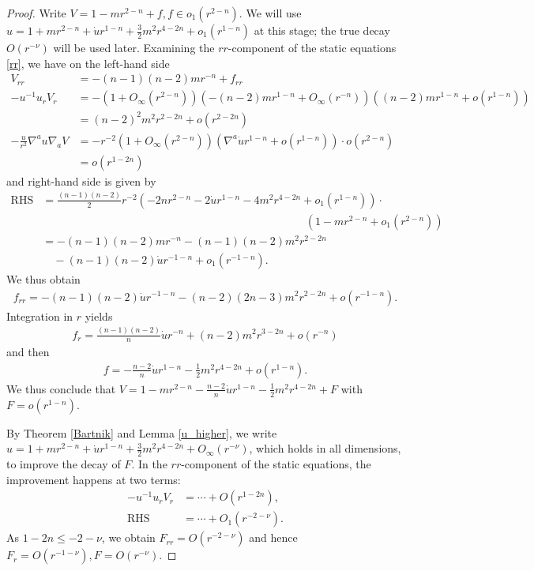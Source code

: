 \documentclass[12pt,twoside]{article}
\theoremstyle{plain}
\theoremstyle{definition}
\theoremstyle{remark}
\newcommand{\na}{\nabla}
\newcommand{\lt}{\left}
\newcommand{\rt}{\right}
\numberwithin{equation}{section}
\begin{document}
\begin{proof}
Write $V = 1 - mr^{2-n} + f, f \in o_1(r^{2-n})$. We will use $u = 1 + mr^{2-n} + \dot u r^{1-n} + \frac{3}{2}m^2 r^{4-2n} + o_1(r^{1-n})$ at this stage; the true decay $O(r^{-\nu})$ will be used later. Examining the $rr$-component of the static equations \eqref{rr}, we have on the left-hand side
\begin{align*}
V_{rr} &= -(n-1)(n-2)m r^{-n} + f_{rr}\\
-u^{-1}u_r V_r &= - (1 + O_\infty(r^{2-n}))(-(n-2)m r^{1-n} + O_\infty(r^{-n}))((n-2)m r^{1-n} + o(r^{1-n})) \\ &= (n-2)^2m^2 r^{2-2n} + o(r^{2-2n})\\
-\frac{u}{r^2}\na^a u \na_a V &= - r^{-2} (1 + O_\infty(r^{2-n})) (\na^a \dot u r^{1-n} + o(r^{1-n})) \cdot o(r^{2-n}) \\ &= o(r^{1-2n})
\end{align*} and right-hand side is given by
\begin{align*}
\mbox{RHS} &= \frac{(n-1)(n-2)}{2} r^{-2} \lt( -2nr^{2-n} - 2\dot u r^{1-n} - 4m^2 r^{4-2n} + o_1(r^{1-n}) \rt) \cdot \\ & \hspace{10cm} (1 - m r^{2-n} + o_1(r^{2-n}) ) \\
&= -(n-1)(n-2)mr^{-n} - (n-1)(n-2)m^2 r^{2-2n} \\
&\quad - (n-1)(n-2)\dot u r^{-1-n} + o_1(r^{-1-n}).
\end{align*}
We thus obtain
\begin{align*}
f_{rr} = - (n-1)(n-2) \dot u r^{-1-n} - (n-2)(2n-3)m^2 r^{2-2n} + o(r^{-1-n}).
\end{align*}
Integration in $r$ yields
\begin{align*}
f_r = \frac{(n-1)(n-2)}{n} \dot u r^{-n} + (n-2) m^2 r^{3-2n} + o(r^{-n})
\end{align*}
and then
\begin{align*}
f = - \frac{n-2}{n}\dot u r^{1-n} - \frac{1}{2}m^2 r^{4-2n} + o(r^{1-n}).
\end{align*}
We thus conclude that $V = 1 - m r^{2-n} - \frac{n-2}{n}\dot u r^{1-n} - \frac{1}{2}m^2 r^{4-2n} + F$ with $F = o(r^{1-n})$.

By Theorem \ref{Bartnik} and Lemma \ref{u_higher}, we write $u = 1 + m r^{2-n} + \dot u r^{1-n} + \frac{3}{2} m^2 r^{4-2n} + O_\infty(r^{-\nu})$, which holds in all dimensions, to improve the decay of $F$. In the $rr$-component of the static equations, the improvement happens at two terms:
\begin{align*}
-u^{-1}u_r V_r &= \cdots + O(r^{1-2n}),\\
\mbox{RHS} &= \cdots +  O_1(r^{-2-\nu}).
\end{align*}
As $1-2n \le -2-\nu$, we obtain $F_{rr} = O(r^{-2-\nu})$ and hence $F_r = O(r^{-1-\nu}), F= O(r^{-\nu})$. 


\end{proof}
\end{document}
